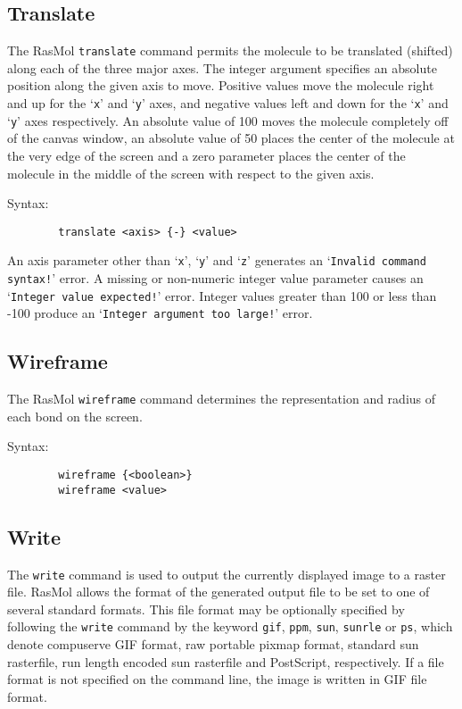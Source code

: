 \subsection{Translate}
\label{CTranslate}

The RasMol {\tt translate} command permits the molecule to be translated
(shifted) along each of the three major axes. The integer argument specifies
an absolute position along the given axis to move. Positive values move the
molecule right and up for the `{\tt x}' and `{\tt y}' axes, and negative 
values left and down for the `{\tt x}' and `{\tt y}' axes respectively. An
absolute value of 100 moves the molecule completely off of the canvas window,
an absolute value of 50 places the center of the molecule at the very edge of
the screen and a zero parameter places the center of the molecule in the 
middle of the screen with respect to the given axis.

Syntax:
\begin{verbatim}
        translate <axis> {-} <value>
\end{verbatim}

An axis parameter other than `{\tt x}', `{\tt y}' and `{\tt z}' generates
an `{\tt Invalid command syntax!}' error. A missing or non-numeric integer
value parameter causes an `{\tt Integer value expected!}' error. Integer 
values greater than 100 or less than -100 produce an `{\tt Integer argument
too large!}' error.


\subsection{Wireframe}
\label{CWireframe}

The RasMol {\tt wireframe} command determines the representation and radius
of each bond on the screen.

Syntax:
\begin{verbatim}
        wireframe {<boolean>}
        wireframe <value>
\end{verbatim}


\subsection{Write}
\label{CWrite}

The {\tt write} command is used to output the currently displayed image to 
a raster file. RasMol allows the format of the generated output file to
be set to one of several standard formats. This file format may be optionally 
specified by following the {\tt write} command by the keyword {\tt gif}, 
{\tt ppm}, {\tt sun}, {\tt sunrle} or {\tt ps}, which denote compuserve 
GIF format, raw portable pixmap format, standard sun rasterfile, run length 
encoded sun rasterfile and PostScript, respectively. If a file format is 
not specified on the command line, the image is written in GIF file format.

